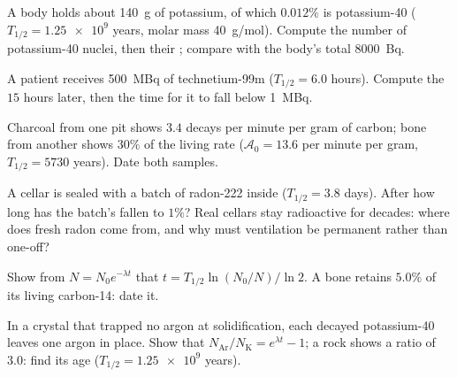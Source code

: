 \begin{exercise}[$\star\star$]\label{exo:g12:radioactive-decay:8}
A body holds about \qty{140}{g} of potassium, of which $0.012\%$ is
potassium-40 ($T_{1/2} = \num{1.25e9}$ years, molar mass \qty{40}{g/mol}).
Compute the number of potassium-40 nuclei, then their ; compare
with the body's total \qty{8000}{Bq}.
\end{exercise}

\begin{exercise}[$\star\star$]\label{exo:g12:radioactive-decay:9}
A patient receives \qty{500}{MBq} of technetium-99m ($T_{1/2} = 6.0$
hours). Compute the  $15$ hours later, then the time for it to
fall below \qty{1}{MBq}.
\end{exercise}

\begin{exercise}[$\star\star$]\label{exo:g12:radioactive-decay:10}
Charcoal from one pit shows $3.4$ decays per minute per gram of carbon;
bone from another shows $30\%$ of the living rate ($\mathcal A_0 = 13.6$
per minute per gram, $T_{1/2} = \num{5730}$ years). Date both samples.
\end{exercise}

\begin{exercise}[$\star\star$]\label{exo:g12:radioactive-decay:11}
A cellar is sealed with a batch of radon-222 inside ($T_{1/2} = 3.8$
days). After how long has the batch's  fallen to $1\%$? Real
cellars stay radioactive for decades: where does fresh radon come from,
and why must ventilation be permanent rather than one-off?
\end{exercise}

\begin{exercise}[$\star\star\star$]\label{exo:g12:radioactive-decay:12}
Show from $N = N_0 e^{-\lambda t}$ that $t = T_{1/2}\ln(N_0/N)/\ln 2$. A
bone retains $5.0\%$ of its living carbon-14: date it.
\end{exercise}

\begin{exercise}[$\star\star\star$]\label{exo:g12:radioactive-decay:13}
In a crystal that trapped no argon at solidification, each decayed
potassium-40  leaves one argon  in place. Show that
$N_{\mathrm{Ar}}/N_{\mathrm K} = e^{\lambda t} - 1$; a rock shows a ratio
of $3.0$: find its age ($T_{1/2} = \num{1.25e9}$ years).
\end{exercise}

